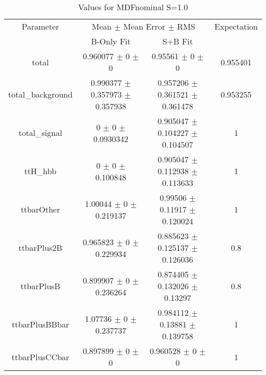\begin{table}
\centering
\caption{Values for MDFnominal S=1.0}
\begin{tabular}{cccc}
\toprule
Parameter & \multicolumn{2}{c}{Mean $\pm$ Mean Error $\pm$ RMS} & Expectation\\
 & B-Only Fit & S+B Fit & \\
\midrule
total & \num{0.960077} $\pm$ \num{0} $\pm$ \num{0} & \num{0.95561} $\pm$ \num{0} $\pm$ \num{0} & \num{0.955401}\\
total\_background & \num{0.990377} $\pm$ \num{0.357973} $\pm$ \num{0.357938} & \num{0.957206} $\pm$ \num{0.361521} $\pm$ \num{0.361478} & \num{0.953255}\\
total\_signal & \num{0} $\pm$ \num{0} $\pm$ \num{0.0930342} & \num{0.905047} $\pm$ \num{0.104227} $\pm$ \num{0.104507} & \num{1}\\
ttH\_hbb & \num{0} $\pm$ \num{0} $\pm$ \num{0.100848} & \num{0.905047} $\pm$ \num{0.112938} $\pm$ \num{0.113633} & \num{1}\\
ttbarOther & \num{1.00044} $\pm$ \num{0} $\pm$ \num{0.219137} & \num{0.99506} $\pm$ \num{0.11917} $\pm$ \num{0.120024} & \num{1}\\
ttbarPlus2B & \num{0.965823} $\pm$ \num{0} $\pm$ \num{0.229934} & \num{0.885623} $\pm$ \num{0.125137} $\pm$ \num{0.126036} & \num{0.8}\\
ttbarPlusB & \num{0.899907} $\pm$ \num{0} $\pm$ \num{0.236264} & \num{0.874405} $\pm$ \num{0.132026} $\pm$ \num{0.13297} & \num{0.8}\\
ttbarPlusBBbar & \num{1.07736} $\pm$ \num{0} $\pm$ \num{0.237737} & \num{0.984112} $\pm$ \num{0.13881} $\pm$ \num{0.139758} & \num{1}\\
ttbarPlusCCbar & \num{0.897899} $\pm$ \num{0} $\pm$ \num{0} & \num{0.960528} $\pm$ \num{0} $\pm$ \num{0} & \num{1}\\
\bottomrule
\end{tabular}
\end{table}